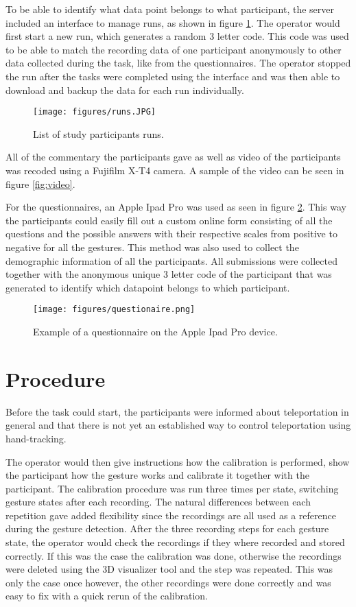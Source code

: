 To be able to identify what data point belongs to what participant, the server included an interface to manage runs, as shown in figure \ref{fig:runs}. The operator would first start a new run, which generates a random 3 letter code. This code was used to be able to match the recording data of one participant anonymously to other data collected during the task, like from the questionnaires. The operator stopped the run after the tasks were completed using the interface and was then able to download and backup the data for each run individually.

\begin{figure}[!ht]
    \centering
    \texttt{[image: figures/runs.JPG]}
    \caption{List of study participants runs.}
    \label{fig:runs}
\end{figure}

All of the commentary the participants gave as well as video of the participants was recoded using a Fujifilm X-T4 camera. A sample of the video can be seen in figure \ref{fig:video}.

For the questionnaires, an Apple Ipad Pro was used as seen in figure \ref{fig:Ipad}. This way the participants could easily fill out a custom online form consisting of all the questions and the possible answers with their respective scales from positive to negative for all the gestures. This method was also used to collect the demographic information of all the participants. All submissions were collected together with the anonymous unique 3 letter code of the participant that was generated to identify which datapoint belongs to which participant. 

\begin{figure}[!ht]
    \centering
    \texttt{[image: figures/questionaire.png]}
    \caption{Example of a questionnaire on the Apple Ipad Pro device.}
    \label{fig:Ipad}
\end{figure}

\section{Procedure}
Before the task could start, the participants were informed about teleportation in general and that there is not yet an established way to control teleportation using hand-tracking.

The operator would then give instructions how the calibration is performed, show the participant how the gesture works and calibrate it together with the participant. The calibration procedure was run three times per state, switching gesture states after each recording. The natural differences between each repetition gave added flexibility since the recordings are all used as a reference during the gesture detection. After the three recording steps for each gesture state, the operator would check the recordings if they where recorded and stored correctly. If this was the case the calibration was done, otherwise the recordings were deleted using the 3D visualizer tool and the step was repeated. This was only the case once however, the other recordings were done correctly and was easy to fix with a quick rerun of the calibration. 

